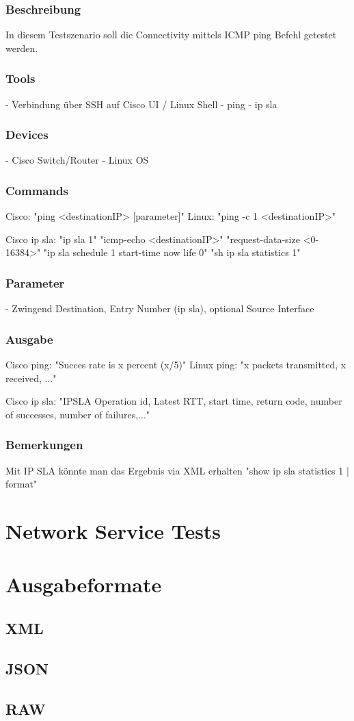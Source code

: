 \documentclass[a4,12pt]{scrartcl}
\begin{document}
\subsubsection{Beschreibung}
In diesem Testszenario soll die Connectivity mittels ICMP ping Befehl getestet werden.
\subsubsection{Tools}
- Verbindung über SSH auf Cisco UI / Linux Shell
- ping
- ip sla

\subsubsection{Devices}
- Cisco Switch/Router
- Linux OS
\subsubsection{Commands}
Cisco: "ping <destinationIP> [parameter]"
Linux: "ping -c 1 <destinationIP>"

Cisco ip sla: 	"ip sla 1"
			 	"icmp-echo <destinationIP>"
			  	"request-data-size <0-16384>"
			  	"ip sla schedule 1 start-time now life 0"
			  	"sh ip sla statistics 1"

\subsubsection{Parameter}
- Zwingend Destination, Entry Number (ip sla), optional Source Interface
\subsubsection{Ausgabe}
Cisco ping: "Succes rate is x percent (x/5)"
Linux ping: "x packets transmitted, x received, ..."

Cisco ip sla: "IPSLA Operation id, Latest RTT, start time, return code, number of successes, number of failures,..."

\subsubsection{Bemerkungen}
Mit IP SLA könnte man das Ergebnis via XML erhalten
"show ip sla statistics 1 | format"
\newpage
\section{Network Service Tests}

\newpage
\section{Ausgabeformate}
\subsection{XML}
\subsection{JSON}
\subsection{RAW}
\end{document}
